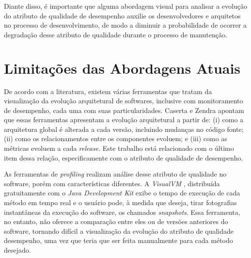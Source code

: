 Diante disso, é importante que alguma abordagem visual para analisar a evolução do atributo de qualidade de desempenho auxilie os desenvolvedores e arquitetos no processo de desenvolvimento, de modo a diminuir a probabilidade de ocorrer a degradação desse atributo de qualidade durante o processo de manutenção. 

\section{Limitações das Abordagens Atuais} \label{sec:limitacao-abordagens-atuais}

De acordo com a literatura, existem várias ferramentas que tratam da visualização da evolução arquitetural de softwares, inclusive com monitoramento de desempenho, cada uma com suas particularidades. Caserta e Zendra \cite{Caserta2011} apontam que essas ferramentas apresentam a evolução arquitetural a partir de: (i) como a arquitetura global é alterada a cada versão, incluindo mudanças no código fonte; (ii) como os relacionamentos entre os componentes evoluem; e (iii) como as métricas evoluem a cada \textit{release}. Este trabalho está relacionado com o último item dessa relação, especificamente com o atributo de qualidade de desempenho.

As ferramentas de \textit{profiling} realizam análise desse atributo de qualidade no software, porém com características diferentes. A \textit{VisualVM} \cite{Vis}, distribuída gratuitamente com o \textit{Java Development Kit} exibe o tempo de execução de cada método em tempo real e o usuário pode, à medida que deseja, tirar fotografias instantâneas da execução do software, os chamados \textit{snapshots}. Essa ferramenta, no entanto, não oferece a comparação entre eles ou de versões anteriores do software, tornando difícil a visualização da evolução do atributo de qualidade desempenho, uma vez que teria que ser feita manualmente para cada método desejado.

